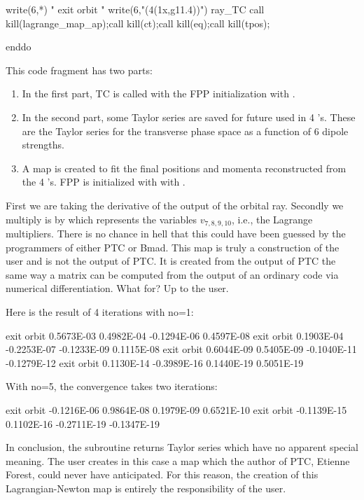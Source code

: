\documentclass{hitec}     %
\begin{document}
{{{{{{\begin{code}
   write(6,*) " exit orbit " 
   write(6,"(4(1x,g11.4))") ray_TC%
   call kill(lagrange_map_ap);call kill(ct);call kill(eq);call kill(tpos);

enddo
\end{code}

This code fragment has two parts:
\begin{enumerate}
\item\label{itf1} In the  first part, TC is called with the FPP initialization  with . 
\item\label{itf2}  In the  second part,  some Taylor series are saved for future used in 4 's. These are the Taylor series for the transverse phase space as a function of 6 dipole strengths.
\item\label{itf3}  A map is created to fit the final positions and momenta reconstructed from the  4 's. FPP is initialized with with . 
\end{enumerate}



First we are taking the derivative of the output of the orbital ray.  
 Secondly we multiply is by  which represents the variables $v_{7,8,9,10}$, i.e., the Lagrange multipliers. There is no chance in hell that this could have been guessed by the  programmers of either PTC or Bmad. This map is truly a construction of the user and is not the output of PTC. It is created from the output of PTC the same way a matrix can be computed from the output of an ordinary  code via numerical differentiation.  What for? Up to the user.
 

Here is the result of 4 iterations with no=1:
\renewcommand{\codefont}{\footnotesize}
\begin{code}
  exit orbit
  0.5673E-03  0.4982E-04 -0.1294E-06  0.4597E-08
  exit orbit
  0.1903E-04 -0.2253E-07 -0.1233E-09  0.1115E-08
  exit orbit
  0.6044E-09  0.5405E-09 -0.1040E-11 -0.1279E-12
  exit orbit
  0.1130E-14 -0.3989E-16  0.1440E-19  0.5051E-19
  \end{code}
  
  With no=5, the convergence takes two iterations:
  \begin{code}
  exit orbit
 -0.1216E-06  0.9864E-08  0.1979E-09  0.6521E-10
  exit orbit
 -0.1139E-15  0.1102E-16 -0.2711E-19 -0.1347E-19
 \end{code}
  \renewcommand{\codefont}{\small}
  
  In conclusion, the subroutine  returns Taylor series which have no apparent  special meaning. The user creates in this case a map which the author of PTC, Etienne Forest, could never have anticipated. For this reason, the creation of this Lagrangian-Newton map is entirely the responsibility of the user.
  
}}}}}}
\end{document}
